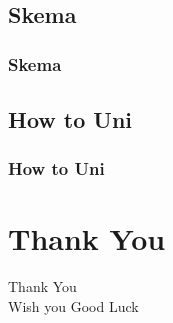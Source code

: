\documentclass[t, aspectratio=169]{beamer}
\begin{document}
\subsection{Skema}
\begin{frame}[fragile]
  \frametitle{Skema}
  \vspace{1mm}
  
\end{frame}

\subsection{How to Uni}
\begin{frame}[fragile]
  \frametitle{How to Uni}
  \vspace{1mm}
  
\end{frame}

\section{Thank You}
\begin{frame}
  \vspace{25mm}
  \begin{center}
    \Huge{Thank You\\Wish you Good Luck \smiley{}}
  \end{center}
\end{frame}
\end{document}

